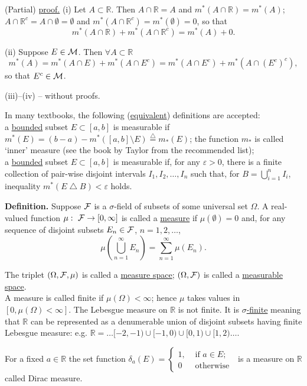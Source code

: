 \documentclass[a4paper,10pt]{article}
\def\RR{\mathbb{R}}
\newcommand{\1}[1]{\mathbf{1}_{\{#1\}}}
\newcommand{\defi}{\stackrel{\triangle}{=}}
\begin{document}
(Partial) \underline{proof.} (i) Let $A\subset\RR$. Then  $A\cap\RR=A$ and $m^*(A\cap\RR)=m^*(A)$; $A\cap\RR^c=A\cap\emptyset=\emptyset$ and $m^*(A\cap \RR^c)=m^*(\emptyset)=0$, so that
  $$m^*(A\cap\RR)+m^*(A\cap\RR^c)=m^*(A)+0.$$

(ii) Suppose $E\in{\cal M}$. Then $\forall A\subset\RR$
  $$m^*(A)=m^*(A\cap E)+m^*(A\cap E^c)=m^*(A\cap E^c)+m^*(A\cap(E^c)^c),$$
so that $E^c\in{\cal M}$.

(iii)--(iv) -- without proofs. \blacksquare \vspace{3mm}

In many textbooks, the following (\underline{equivalent}) definitions are accepted:\\
a \underline{bounded} subset $E\subset [a,b]$ is measurable if $m^*(E)=(b-a)-m^*([a,b]\setminus E)\defi m_*(E)$; the function $m_*$ is called `inner' measure (see the book by Taylor from the recommended list);\\
a \underline{bounded} subset $E\subset [a,b]$ is measurable if, for any $\varepsilon>0$, there is a finite collection of pair-wise disjoint intervals $I_1,I_2,\ldots, I_n$ such that, for $B=\bigcup_{i=1}^n I_i$, inequality $m^*(E\bigtriangleup B)<\varepsilon$ holds.\vspace{3mm}

{\bf Definition.} Suppose $\cal F$ is a $\sigma$-field of subsets of some universal set $\Omega$. A real-valued function $\mu:~{\cal F}\to [0,\infty]$ is called a \underline{measure} if $\mu(\emptyset)=0$ and, for any sequence of disjoint subsets $E_n\in{\cal F}$, $n=1,2,\ldots$,
  $$\mu(\bigcup_{n=1}^\infty E_n)=\sum_{n=1}^\infty \mu(E_n).$$

The triplet $(\Omega,{\cal F},\mu)$ is called a \underline{measure space}; $(\Omega,{\cal F})$ is called a \underline{measurable space}. \\
A measure is called finite if $\mu(\Omega)<\infty$; hence $\mu$ takes values in $[0, \mu(\Omega)<\infty]$. The Lebesgue measure on $\RR$ is not finite. It is \underline{$\sigma$-finite} meaning that $\RR$ can be represented as a denumerable union of disjoint subsets having finite Lebesgue measure: e.g. $\RR=\ldots [-2,-1)\cup[-1,0)\cup[0,1)\cup[1,2)\ldots$.

For a fixed $a\in\RR$ the set function $\delta_a(E)=\left\{\begin{array}{ll} 1, & \mbox{ if } a\in E; \\ 0 & \mbox{ otherwise } \end{array}\right.$ is a measure on $\RR$ called Dirac measure.
\end{document}
